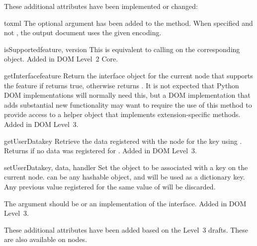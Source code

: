 \documentclass{howto}
\begin{document}
These additional  attributes have been implemented or
changed:

\begin{methoddesc}[Node]{toxml}{}
  The optional  argument has been added to the
   method.  When specified and not , the
  output document uses the given encoding.
\end{methoddesc}

\begin{methoddesc}[Node]{isSupported}{feature, version}
  This is equivalent to calling  on the corresponding 
  object.  Added in DOM Level~2 Core.
\end{methoddesc}

\begin{methoddesc}[Node]{getInterface}{feature}
  Return the interface object for the current node that supports the
   feature if 
  returns true, otherwise returns .  It is not expected
  that Python DOM implementations will normally need this, but a DOM
  implementation that adds substantial new functionality may want to
  require the use of this method to provide access to a helper object
  that implements extension-specific methods.
  Added in DOM Level~3.
\end{methoddesc}

\begin{methoddesc}[Node]{getUserData}{key}
  Retrieve the data registered with the node for the key 
  using .  Returns  if no data was
  registered for .
  Added in DOM Level~3.
\end{methoddesc}

\begin{methoddesc}[Node]{setUserData}{key, data, handler}
  Set the object  to be associated with a key  on
  the current node.   can be any hashable object, and will be
  used as a dictionary key.  Any previous value registered for the
  same value of  will be discarded.

  The  argument should be  or an
  implementation of the  interface.
  Added in DOM Level~3.
\end{methoddesc}

These additional  attributes have been added based on the
Level~3 drafts.  These are also available on 
nodes.
\end{document}
